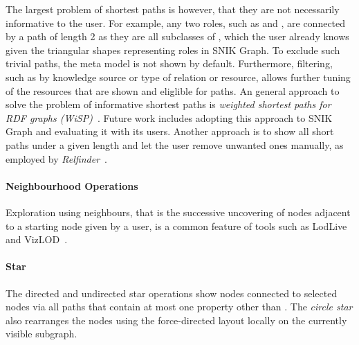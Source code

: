 \documentclass{IOS-Book-Article}     %
\begin{document}
The largest problem of shortest paths is however, that they are not necessarily informative to the user. 
For example, any two roles, such as  and , are connected by a path of length 2 as they are all subclasses of , which the user already knows given the triangular shapes representing roles in SNIK Graph.
To exclude such trivial paths,  the meta model is not shown by default.
Furthermore, filtering, such as by knowledge source or type of relation or resource, allows further tuning of the resources that are shown and eliglible for paths.
An general approach to solve the problem of informative shortest paths is \emph{weighted shortest paths for RDF graphs (WiSP)}~\cite{wisp}.
Future work includes adopting this approach to SNIK Graph and evaluating it with its users.
Another approach is to show all short paths under a given length and let the user remove unwanted ones manually, as employed by \emph{Relfinder}~\cite{relfinder}.

\paragraph{Neighbourhood Operations}
Exploration using neighbours, that is the successive uncovering of nodes adjacent to a starting node given by a user, is a common feature of tools such as LodLive~\cite{lodlive} and VizLOD~\cite{vizlod}.%
\paragraph{Star}
The directed and undirected star operations show nodes connected to selected nodes via all paths that contain at most one property other than .
The \emph{circle star} also rearranges the nodes using the force-directed layout locally on the currently visible subgraph.

\end{document}
